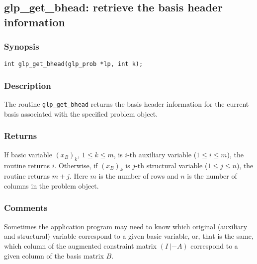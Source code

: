 
\newpage

\subsection{glp\_get\_bhead: retrieve the basis header information}

\subsubsection*{Synopsis}

\begin{verbatim}
int glp_get_bhead(glp_prob *lp, int k);
\end{verbatim}

\subsubsection*{Description}

The routine \verb|glp_get_bhead| returns the basis header information
for the current basis associated with the specified problem object.

\subsubsection*{Returns}

If basic variable $(x_B)_k$, $1\leq k\leq m$, is $i$-th auxiliary
variable ($1\leq i\leq m$), the routine returns $i$. Otherwise, if
$(x_B)_k$ is $j$-th structural variable ($1\leq j\leq n$), the routine
returns $m+j$. Here $m$ is the number of rows and $n$ is the number of
columns in the problem object.

\subsubsection*{Comments}

Sometimes the application program may need to know which original
(auxiliary and structural) variable correspond to a given basic
variable, or, that is the same, which column of the augmented constraint
matrix $(I\ |-\!A)$ correspond to a given column of the basis matrix
$B$.

\def\arraystretch{1}

